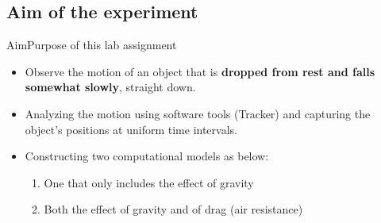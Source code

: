 





\subsection[Aim]{Aim of the experiment}
\begin{frame}{Aim}{Purpose of this lab assignment}
	\begin{itemize}
	\item Observe the motion of an object that is \textbf{dropped from rest
    and falls somewhat slowly}, straight down.
	\item Analyzing the motion using software tools (Tracker) and capturing
    the object's positions at uniform time intervals.
	\item Constructing two computational models as below:
        \begin{enumerate}
        \item One that only includes the effect of gravity
        \item Both the effect of gravity and of drag (air resistance)
        \end{enumerate}
	\end{itemize}
\end{frame}
